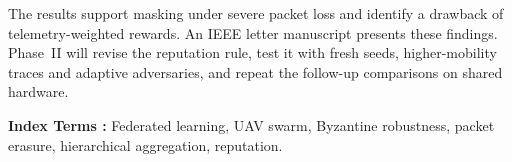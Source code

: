 The results support masking under severe packet loss and identify a drawback
of telemetry-weighted rewards. An IEEE letter manuscript presents these
findings. Phase~II will revise the reputation rule, test it with fresh seeds,
higher-mobility traces and adaptive adversaries, and repeat the follow-up
comparisons on shared hardware.

\textbf{Index Terms :} Federated learning, UAV swarm, Byzantine robustness,
packet erasure, hierarchical aggregation, reputation.
